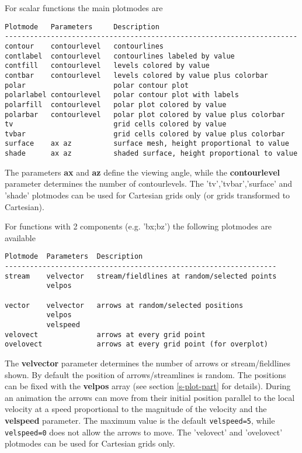    For scalar functions the main plotmodes are 
\begin{verbatim}
Plotmode   Parameters     Description
----------------------------------------------------------------------
contour    contourlevel   contourlines
contlabel  contourlevel   contourlines labeled by value
contfill   contourlevel   levels colored by value
contbar    contourlevel   levels colored by value plus colorbar
polar                     polar contour plot
polarlabel contourlevel   polar contour plot with labels
polarfill  contourlevel   polar plot colored by value
polarbar   contourlevel   polar plot colored by value plus colorbar
tv                        grid cells colored by value
tvbar                     grid cells colored by value plus colorbar
surface    ax az          surface mesh, height proportional to value
shade      ax az          shaded surface, height proportional to value
\end{verbatim}
   The parameters {\bf ax} and {\bf az} define the viewing angle,
   while the {\bf contourlevel} parameter determines the number 
   of contourlevels. The 'tv','tvbar','surface' and 'shade' plotmodes
   can be used for Cartesian grids only (or grids transformed to Cartesian).

   For functions with 2 components (e.g. 'bx;bz') the following plotmodes
   are available
\begin{verbatim}
Plotmode  Parameters  Description
-----------------------------------------------------------------
stream    velvector   stream/fieldlines at random/selected points
          velpos      

vector    velvector   arrows at random/selected positions
          velpos
          velspeed
velovect              arrows at every grid point
ovelovect             arrows at every grid point (for overplot)
\end{verbatim}
   The {\bf velvector} parameter determines the number of arrows or
   stream/fieldlines shown. By default the position of arrows/streamlines
   is random. The positions can be fixed with the {\bf velpos} array
   (see section \ref{s-plot-part} for details). 
   During an animation the arrows can move from their initial position
   parallel to the local velocity at a speed proportional to the magnitude
   of the velocity and the {\bf velspeed} parameter. The maximum value
   is the default {\tt velspeed=5}, while {\tt velspeed=0} does not allow
   the arrows to move. 
   The 'velovect' and 'ovelovect' plotmodes 
   can be used for Cartesian grids only.

